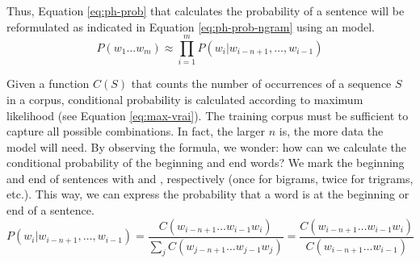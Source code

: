 \documentclass{KBook}
\begin{document}
Thus, Equation \ref{eq:ph-prob} that calculates the probability of a sentence will be reformulated as indicated in Equation \ref{eq:ph-prob-ngram} using an  model.
\begin{equation}\label{eq:ph-prob-ngram}
	P(w_1 \ldots w_m) \approx \prod_{i=1}^{m} P(w_i | w_{i-n+1}, \ldots, w_{i-1})
\end{equation}

Given a function $C(S)$ that counts the number of occurrences of a sequence $S$ in a corpus, conditional probability is calculated according to maximum likelihood (see Equation \ref{eq:max-vrai}).
The training corpus must be sufficient to capture all possible combinations.
In fact, the larger $n$ is, the more data the model will need.
By observing the formula, we wonder: how can we calculate the conditional probability of the beginning and end words?
We mark the beginning and end of sentences with  and , respectively (once for bigrams, twice for trigrams, etc.).
This way, we can express the probability that a word is at the beginning or end of a sentence.
\begin{equation}
	P(w_i | w_{i-n+1},\ldots, w_{i-1}) 
	= \frac{C(w_{i-n+1} \ldots w_{i-1} w_i)}{\sum_j C(w_{j-n+1} \ldots w_{j-1} w_j)}
	= \frac{C(w_{i-n+1} \ldots w_{i-1} w_i)}{C(w_{i-n+1} \ldots w_{i-1})}
	\label{eq:max-vrai}
\end{equation}
\end{document}
